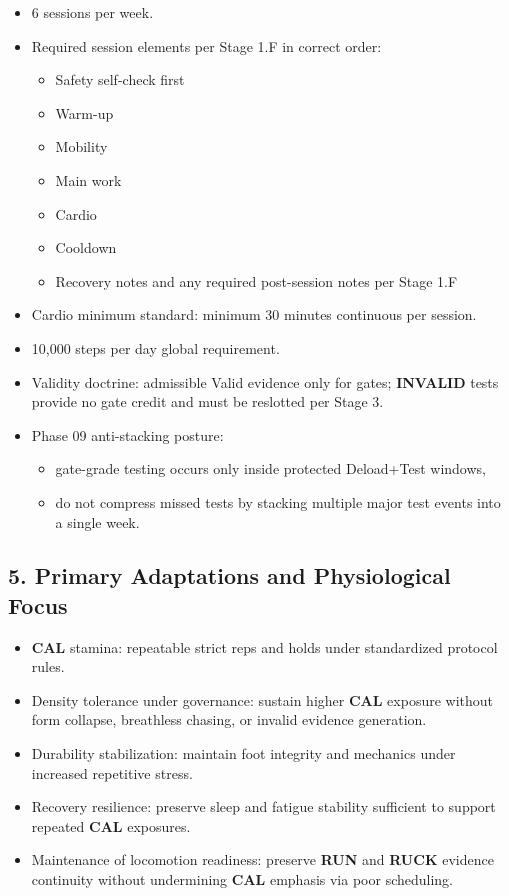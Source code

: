 \documentclass[10pt]{article}
\begin{document}
\begin{itemize}
\item 6 sessions per week.
\item Required session elements per Stage 1.F in correct order:
  \begin{itemize}
  \item Safety self-check first
  \item Warm-up
  \item Mobility
  \item Main work
  \item Cardio
  \item Cooldown
  \item Recovery notes and any required post-session notes per Stage 1.F
  \end{itemize}
\item Cardio minimum standard: minimum 30 minutes continuous per session.
\item 10,000 steps per day global requirement.
\item Validity doctrine: admissible Valid evidence only for gates; \textbf{INVALID} tests provide no gate credit and must be reslotted per Stage 3.
\item Phase 09 anti-stacking posture:
  \begin{itemize}
  \item gate-grade testing occurs only inside protected Deload+Test windows,
  \item do not compress missed tests by stacking multiple major test events into a single week.
  \end{itemize}
\end{itemize}

\subsection*{5. Primary Adaptations and Physiological Focus}


\begin{itemize}
\item \textbf{CAL} stamina: repeatable strict reps and holds under standardized protocol rules.
\item Density tolerance under governance: sustain higher \textbf{CAL} exposure without form collapse, breathless chasing, or invalid evidence generation.
\item Durability stabilization: maintain foot integrity and mechanics under increased repetitive stress.
\item Recovery resilience: preserve sleep and fatigue stability sufficient to support repeated \textbf{CAL} exposures.
\item Maintenance of locomotion readiness: preserve \textbf{RUN} and \textbf{RUCK} evidence continuity without undermining \textbf{CAL} emphasis via poor scheduling.
\end{itemize}
\end{document}
